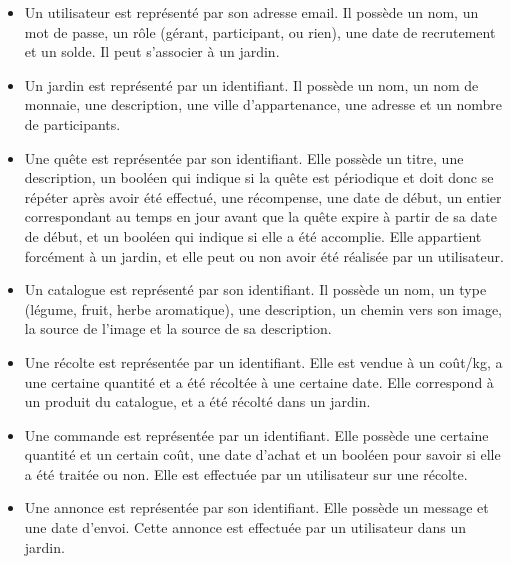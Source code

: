 \documentclass[12pt,titlepage]{report}
\begin{document}
\begin{itemize}
    \item Un utilisateur est représenté par son adresse email. Il possède un nom, un mot de passe, un rôle (gérant, participant, ou rien), une date de recrutement et un solde. Il peut s’associer à un jardin. \\

    \item Un jardin est représenté par un identifiant. Il possède un nom, un nom de monnaie, une description, une ville d’appartenance, une adresse et un nombre de participants. \\

    \item Une quête est représentée par son identifiant. Elle possède un titre, une description, un booléen qui indique si la quête est périodique et doit donc se répéter après avoir été effectué, une récompense, une date de début, un entier correspondant au temps en jour avant que la quête expire à partir de sa date de début, et un booléen qui indique si elle a été accomplie. Elle appartient forcément à un jardin, et elle peut ou non avoir été réalisée par un utilisateur.\\

    \item Un catalogue est représenté par son identifiant. Il possède un nom, un type (légume, fruit, herbe aromatique), une description, un chemin vers son image, la source de l’image et la source de sa description. \\

    \item Une récolte est représentée par un identifiant. Elle est vendue à un coût/kg, a une certaine quantité et a été récoltée à une certaine date. Elle correspond à un produit du catalogue, et a été récolté dans un jardin. \\

    \item Une commande est représentée par un identifiant. Elle possède une certaine quantité et un certain coût, une date d’achat et un booléen pour savoir si elle a été traitée ou non. Elle est effectuée par un utilisateur sur une récolte. \\

    \item Une annonce est représentée par son identifiant. Elle possède un message et une date d’envoi. Cette annonce est effectuée par un utilisateur dans un jardin. \\
    
\end{itemize}
\end{document}
